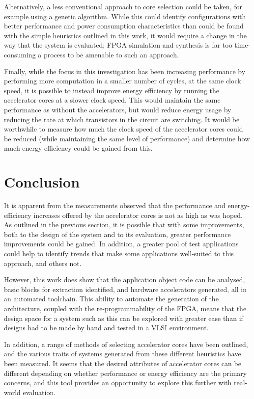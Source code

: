 \documentclass{UoYCSproject}
\begin{document}
Alternatively, a less conventional approach to core selection could be taken, for example using a genetic algorithm.
While this could identify configurations with better performance and power consumption characteristics than could be
found with the simple heuristics outlined in this work, it would require a change in the way that the system is evaluated;
FPGA simulation and synthesis is far too time-consuming a process to be amenable to such an approach.

Finally, while the focus in this investigation has been increasing performance by performing more
computation in a smaller number of cycles, at the same clock speed, it is possible to instead improve
energy efficiency by running the accelerator cores at a slower clock speed. This would maintain the same
performance as without the accelerators, but would reduce energy usage by reducing the rate at which
transistors in the circuit are switching. It would be worthwhile to measure how much the clock speed
of the accelerator cores could be reduced (while maintaining the same level of performance) and determine
how much energy efficiency could be gained from this.

\section{Conclusion}

It is apparent from the measurements observed that the performance and energy-efficiency increases
offered by the accelerator cores is not as high as was hoped. As outlined in the previous section,
it is possible that with some improvements, both to the design of the system and to its evaluation,
greater performance improvements could be gained. In addition, a greater pool of test applications
could help to identify trends that make some applications well-suited to this approach, and others not.

However, this work does show that the application object code can be analysed, basic blocks for extraction
identified, and hardware accelerators generated, all in an automated toolchain.
This ability to automate the generation of the architecture, coupled with the re-programmability
of the FPGA, means that the design space for a system such as this can be explored with greater
ease than if designs had to be made by hand and tested in a VLSI environment.

In addition, a range of methods of selecting accelerator cores have been outlined, and the
various traits of systems generated from these different heuristics have been measured.
It seems that the desired attributes of accelerator cores can be different depending on whether
performance or energy efficiency are the primary concerns, and this tool provides an opportunity
to explore this further with real-world evaluation.
\end{document}
